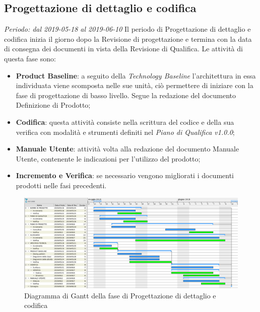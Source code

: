 \subsection{Progettazione di dettaglio e codifica}
\textit{Periodo: dal 2019-05-18 al 2019-06-10}
Il periodo di Progettazione di dettaglio e codifica inizia il giorno dopo la Revisione di progettazione e termina con la data di consegna dei documenti 
in vista della Revisione di Qualifica. Le attività di questa fase sono:
\begin{itemize}
	\item \textbf{Product Baseline\glo}: a seguito della \textit{Technology 
	Baseline\glosp} l'architettura in essa individuata viene scomposta nelle sue unità, ciò permettere di iniziare con la fase di progettazione di basso livello. Segue la redazione del documento Definizione di Prodotto;
	\item \textbf{Codifica}: questa attività consiste nella scrittura del 
	codice e della sua verifica con modalità e strumenti definiti nel 
	\textit{Piano di Qualifica v1.0.0};
	\item \textbf{Manuale Utente}: attività volta alla redazione del documento Manuale Utente, contenente le indicazioni per l'utilizzo del prodotto;
	\item \textbf{Incremento e Verifica}: se necessario vengono migliorati i 
	documenti prodotti nelle fasi precedenti.
\end{itemize}

\begin{figure}[H]
	\includegraphics[width=0.99\linewidth]{res/images/gantt_pd.png}
	\caption{Diagramma di Gantt della fase di Progettazione di dettaglio e codifica}
\end{figure}
\pagebreak


